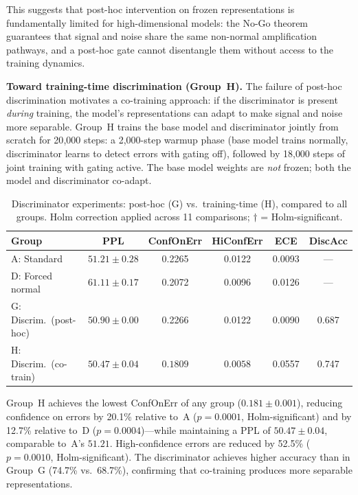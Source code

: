 \documentclass[11pt,a4paper]{article}
\theoremstyle{definition}
\begin{document}
This suggests that post-hoc intervention on frozen representations
is fundamentally limited for high-dimensional models: the
No-Go theorem guarantees that signal and noise share the same
non-normal amplification pathways, and a post-hoc gate cannot
disentangle them without access to the training dynamics.

\textbf{Toward training-time discrimination (Group~H).}
The failure of post-hoc discrimination motivates a co-training
approach: if the discriminator is present \emph{during} training,
the model's representations can adapt to make signal and noise
more separable. Group~H trains the base model and discriminator
jointly from scratch for 20{,}000 steps: a 2{,}000-step warmup
phase (base model trains normally, discriminator learns to detect
errors with gating off), followed by 18{,}000 steps of joint
training with gating active. The base model weights are \emph{not}
frozen; both the model and discriminator co-adapt.

\begin{table}[ht]
\centering
\caption{Discriminator experiments: post-hoc (G) vs.\ training-time
(H), compared to all groups. Holm correction applied across 11
comparisons; $\dagger$ = Holm-significant.}
\label{tab:disc}
\begin{tabular}{@{}lccccc@{}}
\toprule
Group & PPL & ConfOnErr & HiConfErr & ECE & DiscAcc \\
\midrule
A: Standard       & $51.21 \pm 0.28$ & 0.2265 & 0.0122 & 0.0093 & --- \\
D: Forced normal  & $61.11 \pm 0.17$ & 0.2072 & 0.0096 & 0.0126 & --- \\
G: Discrim.\ (post-hoc) & $50.90 \pm 0.00$ & 0.2266 & 0.0122 & 0.0090 & 0.687 \\
H: Discrim.\ (co-train) & $50.47 \pm 0.04$ & $\mathbf{0.1809}$ & $\mathbf{0.0058}$ & 0.0557 & 0.747 \\
\bottomrule
\end{tabular}
\end{table}

Group~H achieves the lowest ConfOnErr of any group
($0.181 \pm 0.001$), reducing confidence on errors by
20.1\% relative to~A ($p = 0.0001$, Holm-significant)
and by 12.7\% relative to~D ($p = 0.0004$)---while
maintaining a PPL of $50.47 \pm 0.04$, comparable to~A's
$51.21$. High-confidence errors are reduced by 52.5\%
($p = 0.0010$, Holm-significant). The discriminator
achieves higher accuracy than in Group~G (74.7\% vs.\
68.7\%), confirming that co-training produces more
separable representations.
\end{document}

